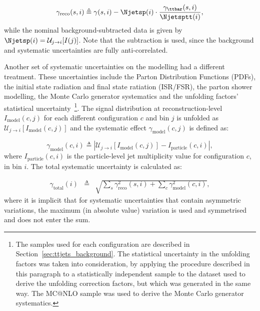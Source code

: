 \begin{equation}
\displaystyle
\gamma_{\textrm{reco}}(s, i) \triangleq \gamma(s, i) - \Njetsp(i) \cdot \frac{\gamma_{\ttbar}(s, i)}{\Njetsptt(i)},
\label{eq:ttjets_totalsyst}
\end{equation}
while the nominal background-subtracted data is given by
$\Njetsp(i) = \mathcal{U}_{j\rightarrow i}[I(j)]$.
Note that the subtraction is used, since
the background and \ttbar systematic uncertainties are fully anti-correlated.

Another set of systematic uncertainties on the \ttbar modelling had a different treatment.
These uncertainties include the Parton Distribution Functions (PDFs), the initial state radiation and final state ratiation (ISR/FSR),
the parton shower modelling, the Monte Carlo generator systematics and the unfolding factors' statistical uncertainty~\footnote{The
samples used for each configuration are described in Section~\ref{sec:ttjets_background}. The statistical uncertainty in the unfolding factors
was taken into consideration, by applying the procedure described in this paragraph to a statistically independent sample to the \ttbar dataset used to
derive the unfolding correction factors, but which was generated in the same way. The MC@NLO sample was used to derive the Monte Carlo generator systematics.}.
The signal distribution at reconstruction-level
$I_{\textrm{model}}(c, j)$ for each different
configuration $c$ and bin $j$ is unfolded as $\mathcal{U}_{j \rightarrow i}[I_{\textrm{model}}(c, j)]$ and the systematic effect $\gamma_{\textrm{model}}(c, j)$ is defined as:

\begin{equation}
\displaystyle
\gamma_{\textrm{model}}(c, i) \triangleq |\mathcal{U}_{j \rightarrow i}[I_{\textrm{model}}(c, j)] - I_{\textrm{particle}}(c, i)|,
\end{equation}
where $I_{\textrm{particle}}(c, i)$ is the particle-level jet multiplicity value for configuration $c$, in bin $i$.
The total systematic uncertainty is calculated as:

\begin{eqnarray}
\displaystyle
\gamma_{\textrm{total}}(i)&\triangleq& \sqrt{ \sum_s \gamma_{\textrm{reco}}^2(s, i) + \sum_c \gamma_{\textrm{model}}^2(c, i) },
\label{eq:ttjets_totalsyst}
\end{eqnarray}
where it is implicit that for systematic uncertainties
that contain
asymmetric variations, the maximum (in absolute value) variation is used and
symmetrised and does not enter the sum.

